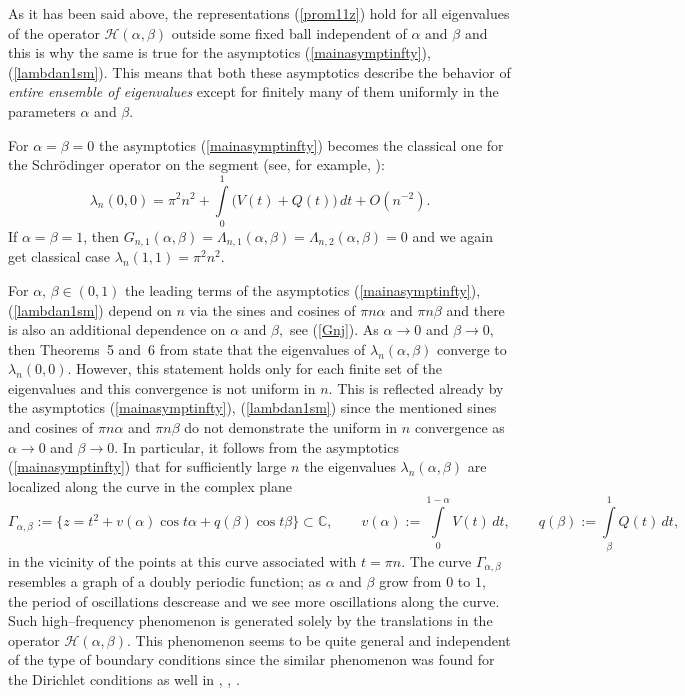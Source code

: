 \documentclass[10pt, a4paper]{article}
\theoremstyle{plain}
\theoremstyle{definition}
\numberwithin{equation}{section}
\def\G{\Gamma}
\def\l{\lambda}
\def\a{\alpha}
\def\b{\beta}
\def\Op{\mathcal{H}}
\begin{document}
As it has been said above, the representations (\ref{prom11z}) hold for all eigenvalues of the operator $\Op(\a,\b)$ outside some fixed ball independent of $\a$ and $\b$ and this is why the same is true for the asymptotics (\ref{mainasymptinfty}), (\ref{lambdan1sm}). This means that both these asymptotics describe the behavior of \textit{entire ensemble of eigenvalues} except for finitely many of them uniformly in the parameters $\a$ and $\b.$


For $\alpha=\beta=0$ the asymptotics (\ref{mainasymptinfty}) becomes the classical one for the Schr\"odinger operator on the segment
(see, for example, \cite[Ch.~1, Sec.~5]{Marchenko}):
$$
\lambda_n(0,0)=\pi^2n^2+ \int\limits_0^1\big(V(t)+Q(t)\big)\,dt+O(n^{-2}).
$$
If $\alpha=\beta=1$, then $G_{n, 1}(\alpha, \beta)=\Lambda_{n, 1}(\alpha, \beta)=\Lambda_{n, 2}(\alpha, \beta)=0$ and we again get classical case $\lambda_n(1,1)=\pi^2n^2$.

For  $\alpha,\, \beta\in (0, 1)$ the leading terms of  the asymptotics (\ref{mainasymptinfty}),  (\ref{lambdan1sm}) depend on  $n$ via the sines and cosines of $\pi n \a$ and $\pi n \b$ and there is also an  additional  dependence on $\a$ and $\b,$ see (\ref{Gnj}). As $\a\to0$ and $\b\to0,$
then Theorems~5 and~6 from \cite{Borisov_Polyakov} state that the eigenvalues of $\l_n(\a,\b)$ converge to $\l_n(0,0).$ However, this statement holds only for each finite set of the eigenvalues and this convergence is not uniform in $n.$
  This is reflected already by the asymptotics (\ref{mainasymptinfty}), (\ref{lambdan1sm}) since the mentioned sines and cosines of $\pi n\a$ and $\pi n\b$ do not demonstrate the uniform in $n$ convergence as $\a\to0$ and $\b\to0.$ In particular, it follows from
the asymptotics (\ref{mainasymptinfty}) that
for sufficiently large $n$ the eigenvalues $\l_n(\a,\b)$
 are localized
along the curve in the complex plane
$$
\Gamma_{\alpha, \beta}:=\big\{z=t^2+v(\a)\cos t\alpha+q(\beta)\cos t\beta\big\}\subset\mathds{C}, \qquad
v(\alpha):=\int\limits_0^{1-\alpha}V(t)\,dt, \qquad q(\beta):=\int\limits_\beta^{1}Q(t)\,dt,
$$
in the vicinity of the points  at this curve associated with   $t=\pi n$. The curve $\G_{\a,\b}$ resembles a graph of a doubly periodic function; as $\a$ and $\b$ grow from $0$ to $1,$ the period of oscillations  descrease and we see more oscillations along the curve. Such high--frequency phenomenon is generated solely by the translations  in the operator $\Op(\a,\b)$. This phenomenon seems to be quite general and independent of the type of boundary conditions since the similar phenomenon was found for the Dirichlet conditions as well in \cite{Borisov_PolyakovDAN}, \cite{Borisov_PolyakovIZV}, \cite{Borisov_PolyakovUMJ}.
\end{document}
